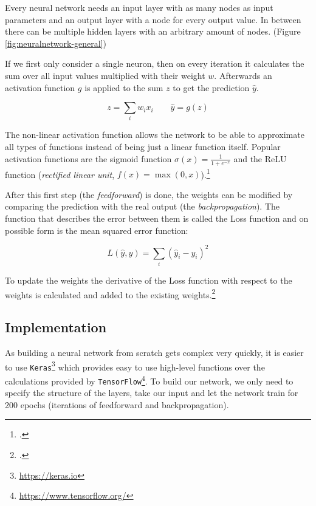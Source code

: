 Every neural network needs an input layer with as many nodes as input parameters and an output layer with a node for every output value. In between there can be multiple hidden layers with an arbitrary amount of nodes. (Figure \ref{fig:neuralnetwork-general})

If we first only consider a single neuron, then on every iteration it calculates the sum over all input values multiplied with their weight $w$. Afterwards an activation function $g$ is applied to the sum $z$ to get the prediction $\hat{y}$.

\begin{equation}
	z=\sum_{i}w_ix_i \qquad \hat{y}=g(z)
\end{equation}

The non-linear activation function allows the network to be able to approximate all types of functions instead of being just a linear function itself. Popular activation functions are the sigmoid function $\sigma(x)={\frac {1}{1+e^{-x}}}$ and the ReLU function (\textit{rectified linear unit}, $f(x)=\max(0,x)$).\footcite{NN-math}

After this first step (the \textit{feedforward}) is done, the weights can be modified by comparing the prediction with the real output (the \textit{backpropagation}). The function that describes the error between them is called the Loss function and on possible form is the mean squared error function:

\begin{equation}
	L(\hat{y},y)=\sum_{i}(\hat{y}_i-y_i)^2
\end{equation}

To update the weights the derivative of the Loss function with respect to the weights is calculated and added to the existing weights.\footcite{NN-python}



\subsection{Implementation}

As building a neural network from scratch gets complex very quickly, it is easier to use \texttt{Keras}\footnote{\url{https://keras.io}} which provides easy to use high-level functions over the calculations provided by \texttt{TensorFlow}\footnote{\url{https://www.tensorflow.org/}}. To build our network, we only need to specify the structure of the layers, take our input and let the network train for 200 epochs (iterations of feedforward and backpropagation).

